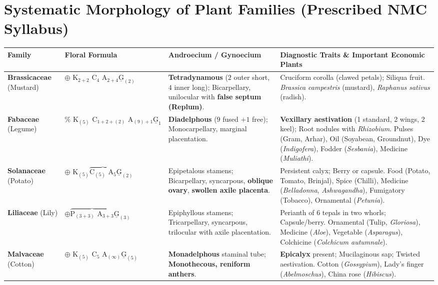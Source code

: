 \documentclass[10pt,a4paper]{article}
\begin{document}
\section{Systematic Morphology of Plant Families (Prescribed NMC Syllabus)}

\begin{conceptbox}
\begin{center}
\scriptsize
\begin{tabular}{|p{1.9cm}|p{3.4cm}|p{2.9cm}|p{6.4cm}|}
\hline
\textbf{Family} & \textbf{Floral Formula} & \textbf{Androecium / Gynoecium} & \textbf{Diagnostic Traits \& Important Economic Plants} \\
\hline
\textbf{Brassicaceae} (Mustard) & $\oplus \text{ K}_{2+2} \text{ C}_4 \text{ A}_{2+4} \underline{\text{G}}_{(2)}$ & \textbf{Tetradynamous} ($2$ outer short, $4$ inner long); Bicarpellary, unilocular with \textbf{false septum (Replum)}. & Cruciform corolla (clawed petals); Siliqua fruit. \textit{Brassica campestris} (mustard), \textit{Raphanus sativus} (radish). \\
\hline
\textbf{Fabaceae} (Legume) & $\% \text{ K}_{(5)} \text{ C}_{1+2+(2)} \text{ A}_{(9)+1} \underline{\text{G}}_1$ & \textbf{Diadelphous} ($9$ fused $+ 1$ free); Monocarpellary, marginal placentation. & \textbf{Vexillary aestivation} (1 standard, 2 wings, 2 keel); Root nodules with \textit{Rhizobium}. Pulses (Gram, Arhar), Oil (Soyabean, Groundnut), Dye (\textit{Indigofera}), Fodder (\textit{Sesbania}), Medicine (\textit{Muliathi}). \\
\hline
\textbf{Solanaceae} (Potato) & $\oplus \text{ K}_{(5)} \overbrace{\text{C}_{(5)} \text{ A}_5} \underline{\text{G}}_{(2)}$ & Epipetalous stamens; Bicarpellary, syncarpous, \textbf{oblique ovary}, \textbf{swollen axile placenta}. & Persistent calyx; Berry or capsule. Food (Potato, Tomato, Brinjal), Spice (Chilli), Medicine (\textit{Belladonna}, \textit{Ashwagandha}), Fumigatory (Tobacco), Ornamental (\textit{Petunia}). \\
\hline
\textbf{Liliaceae} (Lily) & $\oplus \overbrace{\text{P}_{(3+3)} \text{ A}_{3+3}} \underline{\text{G}}_{(3)}$ & Epiphyllous stamens; Tricarpellary, syncarpous, trilocular with axile placentation. & Perianth of 6 tepals in two whorls; Capsule/berry. Ornamental (Tulip, \textit{Gloriosa}), Medicine (\textit{Aloe}), Vegetable (\textit{Asparagus}), Colchicine (\textit{Colchicum autumnale}). \\
\hline
\textbf{Malvaceae} (Cotton) & $\oplus \text{ K}_{(5)} \text{ C}_5 \text{ A}_{(\infty)} \underline{\text{G}}_{(5)}$ & \textbf{Monadelphous} staminal tube; \textbf{Monothecous, reniform anthers}. & \textbf{Epicalyx} present; Mucilaginous sap; Twisted aestivation. Cotton (\textit{Gossypium}), Lady's finger (\textit{Abelmoschus}), China rose (\textit{Hibiscus}). \\

\end{tabular}
\end{center}
\end{conceptbox}
\end{document}
